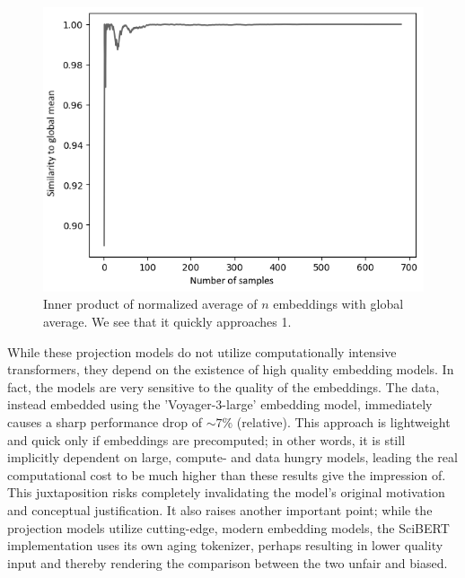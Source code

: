 \begin{figure}%
    \centering
    \includegraphics[width=0.7\linewidth]{media/few_shot_sampling.png}
    \caption{Inner product of normalized average of $n$ embeddings with global average. We see that it quickly approaches 1.}
    \label{fig:106}
\end{figure}


While these projection models do not utilize computationally intensive transformers, they depend on the existence of high quality embedding models. In fact, the models are very sensitive to the quality of the embeddings. The data, instead embedded using the 'Voyager-3-large' embedding model, immediately causes a sharp performance drop of $\sim 7\%$ (relative). This approach is lightweight and quick only if embeddings are precomputed; in other words, it is still implicitly dependent on large, compute- and data hungry models, leading the real computational cost to be much higher than these results give the impression of. This juxtaposition risks completely invalidating the model’s original motivation and conceptual justification. It also raises another important point; while the projection models utilize cutting-edge, modern embedding models, the SciBERT implementation uses its own aging tokenizer, perhaps resulting in lower quality input and thereby rendering the comparison between the two unfair and biased.

